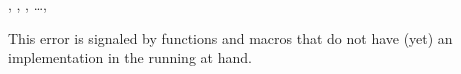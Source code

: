 \documentclass[../Comparisons-Predicates.tex]{subfiles}
\begin{document}

\DSupertypes{}

, ,
, \ldots, 

\DDescription{}

This error is signaled by functions and macros that do not have (yet)
an implementation in the running \CL{} at hand.
\end{document}
